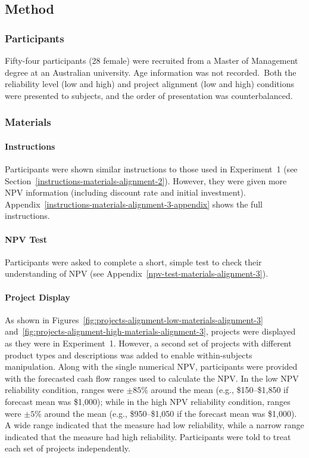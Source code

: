 \documentclass[a4paper, nobind]{templates/ociamthesis}
\theoremstyle{definition}
\theoremstyle{definition}
\theoremstyle{definition}
\theoremstyle{definition}
\theoremstyle{remark}
\begin{document}
\hypertarget{method-alignment-2}{%
\subsection{Method}\label{method-alignment-2}}

\subsubsection{Participants}

Fifty-four participants (28 female) were recruited from a Master of Management degree at an Australian university. Age information was not recorded.~Both the reliability level (low and high) and
project alignment (low and high) conditions were presented to subjects, and the
order of presentation was counterbalanced.

\subsubsection{Materials}

\paragraph{Instructions}

Participants were shown similar instructions to those used in Experiment~1 (see
Section~\ref{instructions-materials-alignment-2}). However, they were given
more NPV information (including discount rate and initial investment).
Appendix~\ref{instructions-materials-alignment-3-appendix} shows the full
instructions.

\paragraph{NPV Test}

Participants were asked to complete a short, simple test to check their
understanding of NPV (see Appendix~\ref{npv-test-materials-alignment-3}).

\paragraph{Project Display}

As shown in Figures~\ref{fig:projects-alignment-low-materials-alignment-3}
and~\ref{fig:projects-alignment-high-materials-alignment-3}, projects were
displayed as they were in Experiment~1. However, a second set of projects with
different product types and descriptions was added to enable within-subjects
manipulation. Along with the single numerical NPV, participants were provided
with the forecasted cash flow ranges used to calculate the NPV. In the low NPV
reliability condition, ranges were \(\pm85\)\% around the mean (e.g., \$150--\$1,850
if forecast mean was \$1,000); while in the high NPV reliability condition,
ranges were \(\pm5\)\% around the mean (e.g., \$950--\$1,050 if the forecast mean was
\$1,000). A wide range indicated that the measure had low reliability, while a
narrow range indicated that the measure had high reliability. Participants were
told to treat each set of projects independently.
\end{document}
